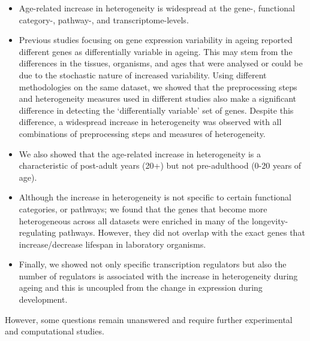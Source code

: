 \documentclass[12pt,twoside]{unicam}
\providecommand{\tightlist}{%
  \setlength{\itemsep}{0pt}\setlength{\parskip}{0pt}}
\begin{document}
\begin{itemize}
\tightlist
\item
  Age-related increase in heterogeneity is widespread at the gene-, functional category-, pathway-, and transcriptome-levels.
\item
  Previous studies focusing on gene expression variability in ageing reported different genes as differentially variable in ageing. This may stem from the differences in the tissues, organisms, and ages that were analysed or could be due to the stochastic nature of increased variability. Using different methodologies on the same dataset, we showed that the preprocessing steps and heterogeneity measures used in different studies also make a significant difference in detecting the `differentially variable' set of genes. Despite this difference, a widespread increase in heterogeneity was observed with all combinations of preprocessing steps and measures of heterogeneity.
\item
  We also showed that the age-related increase in heterogeneity is a characteristic of post-adult years (20+) but not pre-adulthood (0-20 years of age).
\item
  Although the increase in heterogeneity is not specific to certain functional categories, or pathways; we found that the genes that become more heterogeneous across all datasets were enriched in many of the longevity-regulating pathways. However, they did not overlap with the exact genes that increase/decrease lifespan in laboratory organisms.
\item
  Finally, we showed not only specific transcription regulators but also the number of regulators is associated with the increase in heterogeneity during ageing and this is uncoupled from the change in expression during development.
\end{itemize}

However, some questions remain unanswered and require further experimental and computational studies.
\end{document}
